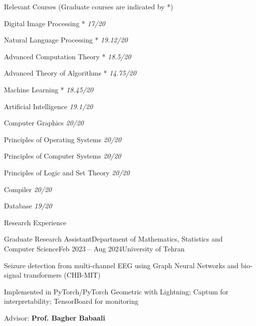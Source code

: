 \documentclass[]{main}
\begin{document}
\begin{section}{Relevant Courses \small{(Graduate courses are indicated by *)}}
 \begin{multicols}{2}
     \begin{subsectionbullet}
         \item Digital Image Processing * \hfill \textit{17/20}
         \item Natural Language Processing * \hfill \textit{19.12/20}
         \item Advanced Computation Theory * \hfill \textit{18.5/20}
         \item Advanced Theory of Algorithms * \hfill \textit{14.75/20}
         \item Machine Learning * \hfill \textit{18.45/20}
         \item Artificial Intelligence \hfill \textit{19.1/20}
         \item Computer Graphics \hfill \textit{20/20}
         \item Principles of Operating Systems \hfill \textit{20/20}
         \item Principles of Computer Systems \hfill \textit{20/20}
         \item Principles of Logic and Set Theory \hfill \textit{20/20}
         \item Compiler \hfill \textit{20/20}
         \item Database \hfill \textit{19/20}
     \end{subsectionbullet}
 \end{multicols}
\end{section}


\begin{section}{Research Experience}
 \begin{subsection}{Graduate Research Assistant}{Department of Mathematics, Statistics and Computer Science}{Feb 2023 -- Aug 2024}{University of Tehran}
     \item Seizure detection from multi-channel EEG using Graph Neural Networks and bio-signal transformers (CHB-MIT)
     \item Implemented in PyTorch/PyTorch Geometric with Lightning; Captum for interpretability; TensorBoard for monitoring
     \item Advisor: \textbf{Prof. Bagher Babaali}
 \end{subsection}
\end{section}
\end{document}
